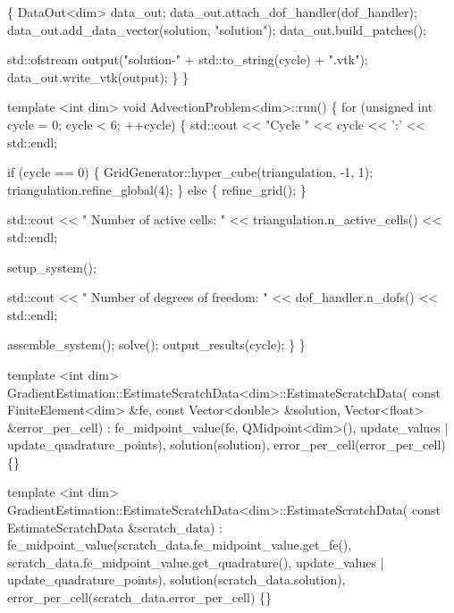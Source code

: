 \begin{DoxyCodeInclude}
    \{
        DataOut<dim> data\_out;
        data\_out.attach\_dof\_handler(dof\_handler);
        data\_out.add\_data\_vector(solution, \textcolor{stringliteral}{"solution"});
        data\_out.build\_patches();

        std::ofstream output(\textcolor{stringliteral}{"solution-"} + std::to\_string(cycle) + \textcolor{stringliteral}{".vtk"});
        data\_out.write\_vtk(output);
    \}
\}


\textcolor{keyword}{template} <\textcolor{keywordtype}{int} dim>
\textcolor{keywordtype}{void} AdvectionProblem<dim>::run()
\{
    \textcolor{keywordflow}{for} (\textcolor{keywordtype}{unsigned} \textcolor{keywordtype}{int} cycle = 0; cycle < 6; ++cycle) \{
        std::cout << \textcolor{stringliteral}{"Cycle "} << cycle << \textcolor{charliteral}{':'} << std::endl;

        \textcolor{keywordflow}{if} (cycle == 0) \{
            GridGenerator::hyper\_cube(triangulation, -1, 1);
            triangulation.refine\_global(4);
        \} \textcolor{keywordflow}{else} \{
            refine\_grid();
        \}


        std::cout << \textcolor{stringliteral}{"   Number of active cells:       "}
                  << triangulation.n\_active\_cells() << std::endl;

        setup\_system();

        std::cout << \textcolor{stringliteral}{"   Number of degrees of freedom: "} << dof\_handler.n\_dofs()
                  << std::endl;

        assemble\_system();
        solve();
        output\_results(cycle);
    \}
\}



\textcolor{keyword}{template} <\textcolor{keywordtype}{int} dim>
GradientEstimation::EstimateScratchData<dim>::EstimateScratchData(
    \textcolor{keyword}{const} FiniteElement<dim> &fe, \textcolor{keyword}{const} Vector<double> &solution,
    Vector<float> &error\_per\_cell)
    : fe\_midpoint\_value(fe, QMidpoint<dim>(),
                        update\_values | update\_quadrature\_points),
      solution(solution),
      error\_per\_cell(error\_per\_cell)
\{\}


\textcolor{keyword}{template} <\textcolor{keywordtype}{int} dim>
GradientEstimation::EstimateScratchData<dim>::EstimateScratchData(
    \textcolor{keyword}{const} EstimateScratchData &scratch\_data)
    : fe\_midpoint\_value(scratch\_data.fe\_midpoint\_value.get\_fe(),
                        scratch\_data.fe\_midpoint\_value.get\_quadrature(),
                        update\_values | update\_quadrature\_points),
      solution(scratch\_data.solution),
      error\_per\_cell(scratch\_data.error\_per\_cell)
\{\}



\end{DoxyCodeInclude}
